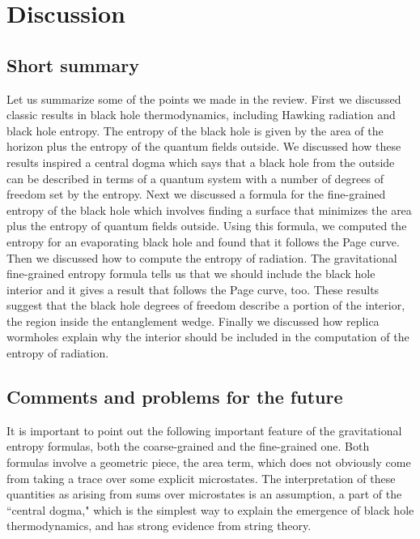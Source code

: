 
\section{Discussion} 

\subsection{Short summary} 

Let us summarize some of the points we made in the review. 
First we discussed classic results in black hole thermodynamics, including Hawking radiation and black hole entropy. The entropy of the black hole is given by the area of the horizon plus the entropy of the quantum fields outside. 
We discussed how these results inspired a central dogma which says that a black hole from the outside can be described in terms of a quantum system with a number of degrees of freedom set by the entropy. 
Next we discussed a formula for the fine-grained entropy of the black hole which involves finding a surface that minimizes the area plus the entropy of quantum fields outside.
Using this formula,  we computed the entropy for an evaporating black hole and found that it follows the Page curve. Then we discussed how to compute the entropy of radiation. The gravitational fine-grained entropy formula tells us that we should include the black hole interior and it gives a result that follows the Page curve, too. 
These results suggest that the black hole degrees of freedom describe a portion of the interior, the region inside the entanglement wedge. 
Finally we discussed how replica wormholes explain why the interior should be included in the computation of the entropy of radiation.  

\subsection{Comments and problems for the future } 

It is important to point out the following important feature of the gravitational entropy formulas, both the coarse-grained and the fine-grained one. Both formulas involve a geometric piece, the area term, which does not obviously come from taking a trace over some explicit microstates. The interpretation of these quantities as arising from sums over microstates is an assumption, a part of the ``central dogma," which is the simplest way to explain the emergence of black hole thermodynamics, and  has strong evidence from string theory.

